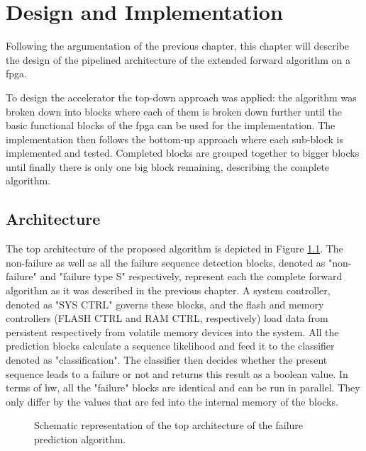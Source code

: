 \documentclass[mscthesis]{usiinfthesis}
\begin{document}
\chapter{Design and Implementation}
\label{ch:design}
\glsresetall %

Following the argumentation of the previous chapter, this chapter will describe
the design of the pipelined architecture of the extended forward algorithm on
a \gls{fpga}.

To design the accelerator the top-down approach was applied: the algorithm was
broken down into blocks where each of them is broken down further until the
basic functional blocks of the \gls{fpga} can be used for the implementation.
The implementation then follows the bottom-up approach where each sub-block is
implemented and tested. Completed blocks are grouped together to bigger blocks
until finally there is only one big block remaining, describing the complete
algorithm.

\section{Architecture}
\label{ch:design_arch}

The top architecture of the proposed algorithm is depicted in Figure
\ref{fig:arch_top}. The non-failure as well as all the failure sequence
detection blocks, denoted as "non-failure" and "failure type S" respectively,
represent each the complete forward algorithm as it was described in the
previous chapter. A system controller, denoted as "SYS CTRL" governs these
blocks, and the flash and memory controllers (FLASH CTRL and RAM CTRL,
respectively) load data from persistent respectively from volatile memory
devices into the system. All the prediction blocks calculate a sequence
likelihood and feed it to the classifier denoted as "classification". The
classifier then decides whether the present sequence leads to a failure or not
and returns this result as a boolean value. In terms of \gls{hw}, all the
"failure" blocks are identical and can be run in parallel. They only differ by
the values that are fed into the internal memory of the blocks.

\begin{figure}
    \centering
    
    \caption{Schematic representation of the top architecture of the failure
        prediction algorithm.}
    \label{fig:arch_top}
\end{figure}
\end{document}

